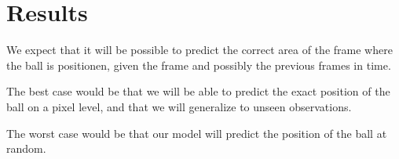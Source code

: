 
\section{Results}

We expect that it will be possible to predict the correct area of the
frame where the ball is positionen, given the frame and possibly the
previous frames in time.

The best case would be that we will be able to predict the exact
position of the ball on a pixel level, and that we will generalize
to unseen observations.

The worst case would be that our model will predict the position of the
ball at random.
